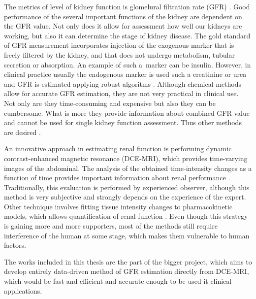 The metrics of level of kidney function is glomelural filtration rate (GFR) \cite{traynor2006measure}. Good performance of the several important functions of the kidney are dependent on the GFR value. Not only does it allow for assessment how well our kidneys are working, but also it can determine the stage of kidney disease.
The gold standard of GFR measurement incorporates injection of the exogenous marker that is freely filtered by the kidney, and that does not undergo metabolism, tubular secretion or absorption. An example of such a~marker can be insulin.
However, in clinical practice usually the endogenous marker is used such a creatinine or urea and GFR is estimated applying robust algoritms \cite{delanaye2012measuring}.
Although chemical methods allow for accurate GFR estimation, they are not very practical in clinical use. Not only are they time-consuming and expensive but also they can be cumbersome. What is more they provide information about combined GFR value and cannot be used for single kidney function assessment. Thus other methods are desired \cite{bokacheva2008assessment}.

An innovative approach in estimating renal function is performing dynamic contrast-enhanced magnetic resonance (DCE-MRI), which provides time-varying images of the abdominal.
The analysis of the obtained time-intensity changes as a function of time provides important information about renal performance \cite{bokacheva2008assessment, khalifa2014models}. Traditionally, this evaluation is performed by experienced observer, although this method is very subjective and strongly depends on the experience of the expert. Other technique involves fitting tissue intensity changes to pharmacokinetic models, which allows quantification of renal function \cite{khalifa2014models}. Even though this strategy is gaining more and more supporters, most of the methods still require interference of the human at some stage, which makes them vulnerable to human factors. 

The works included in this thesis are the part of the bigger project, which aims to develop entirely data-driven method of GFR estimation directly from DCE-MRI, which would be fast and efficient and accurate enough to be used it clinical applications.  
 

